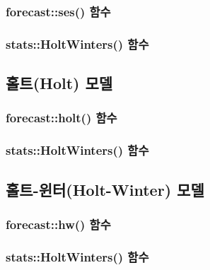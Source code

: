 \documentclass[
]{book}
\begin{document}
\hypertarget{forecastses-uxd568uxc218}{%
\subsubsection{forecast::ses() 함수}\label{forecastses-uxd568uxc218}}

\hypertarget{statsholtwinters-uxd568uxc218}{%
\subsubsection{stats::HoltWinters() 함수}\label{statsholtwinters-uxd568uxc218}}

\hypertarget{uxd640uxd2b8holt-uxbaa8uxb378}{%
\subsection{홀트(Holt) 모델}\label{uxd640uxd2b8holt-uxbaa8uxb378}}

\hypertarget{forecastholt-uxd568uxc218}{%
\subsubsection{forecast::holt() 함수}\label{forecastholt-uxd568uxc218}}

\hypertarget{statsholtwinters-uxd568uxc218-1}{%
\subsubsection{stats::HoltWinters() 함수}\label{statsholtwinters-uxd568uxc218-1}}

\hypertarget{uxd640uxd2b8-uxc708uxd130holt-winter-uxbaa8uxb378}{%
\subsection{홀트-윈터(Holt-Winter) 모델}\label{uxd640uxd2b8-uxc708uxd130holt-winter-uxbaa8uxb378}}

\hypertarget{forecasthw-uxd568uxc218}{%
\subsubsection{forecast::hw() 함수}\label{forecasthw-uxd568uxc218}}

\hypertarget{statsholtwinters-uxd568uxc218-2}{%
\subsubsection{stats::HoltWinters() 함수}\label{statsholtwinters-uxd568uxc218-2}}
\end{document}
